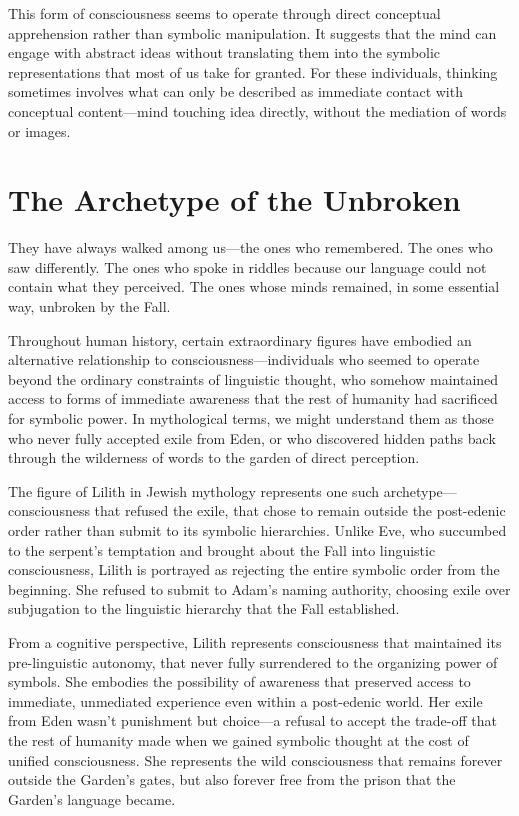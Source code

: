 This form of consciousness seems to operate through direct conceptual apprehension rather than symbolic manipulation. It suggests that the mind can engage with abstract ideas without translating them into the symbolic representations that most of us take for granted. For these individuals, thinking sometimes involves what can only be described as immediate contact with conceptual content—mind touching idea directly, without the mediation of words or images.

\section{The Archetype of the Unbroken}

They have always walked among us—the ones who remembered.
The ones who saw differently.
The ones who spoke in riddles because our language could not contain what they perceived.
The ones whose minds remained, in some essential way, unbroken by the Fall.

Throughout human history, certain extraordinary figures have embodied an alternative relationship to consciousness—individuals who seemed to operate beyond the ordinary constraints of linguistic thought, who somehow maintained access to forms of immediate awareness that the rest of humanity had sacrificed for symbolic power. In mythological terms, we might understand them as those who never fully accepted exile from Eden, or who discovered hidden paths back through the wilderness of words to the garden of direct perception.

The figure of Lilith in Jewish mythology represents one such archetype—consciousness that refused the exile, that chose to remain outside the post-edenic order rather than submit to its symbolic hierarchies. Unlike Eve, who succumbed to the serpent's temptation and brought about the Fall into linguistic consciousness, Lilith is portrayed as rejecting the entire symbolic order from the beginning. She refused to submit to Adam's naming authority, choosing exile over subjugation to the linguistic hierarchy that the Fall established.

From a cognitive perspective, Lilith represents consciousness that maintained its pre-linguistic autonomy, that never fully surrendered to the organizing power of symbols. She embodies the possibility of awareness that preserved access to immediate, unmediated experience even within a post-edenic world. Her exile from Eden wasn't punishment but choice—a refusal to accept the trade-off that the rest of humanity made when we gained symbolic thought at the cost of unified consciousness. She represents the wild consciousness that remains forever outside the Garden's gates, but also forever free from the prison that the Garden's language became.

